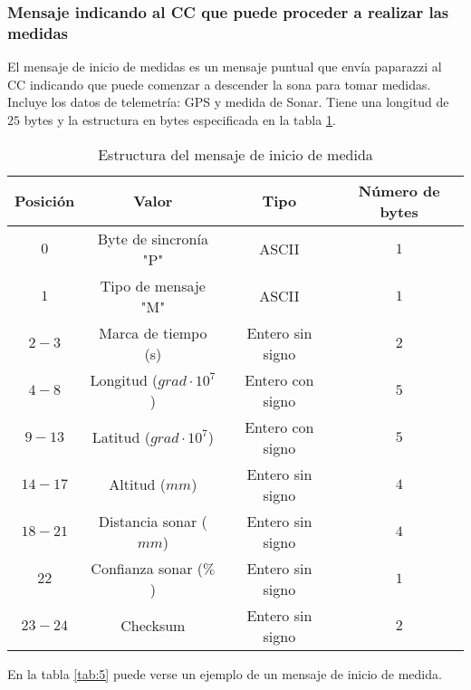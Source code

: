 \subsubsection{Mensaje indicando al CC que puede proceder a realizar las medidas}

El mensaje de inicio de medidas es un mensaje puntual que envía paparazzi al CC indicando que puede comenzar a descender la sona para tomar medidas. Incluye los datos de telemetría: GPS y medida de Sonar. Tiene una longitud de $25$ bytes y la estructura en bytes especificada en la tabla \ref{tab:4}.

\begin{table}[h]
	\centering
	\caption{Estructura del mensaje de inicio de medida}
	\begin{tabular}{|c|c|c|c|}\hline 
		\textbf{Posición}	& \textbf{Valor} & \textbf{Tipo} &\textbf{Número de bytes} \\ \hline \hline 
		$0$		& Byte de sincronía "P"				& ASCII	 			&	$1$ \\  \hline
		$1$		& Tipo de mensaje "M"				& ASCII	 			&	$1$ \\  \hline
		$2-3$	& Marca de tiempo (s)				& Entero sin signo	&   $2$ \\  \hline
		$4-8$	& Longitud ($grad \cdot 10^{7}$)	& Entero con signo	&   $5$ \\  \hline
		$9-13$	& Latitud ($grad \cdot 10^{7}$)		& Entero con signo	&  	$5$ \\  \hline
		$14-17$	& Altitud ($mm$)					& Entero sin signo	&   $4$ \\  \hline
		$18-21$	& Distancia sonar ($mm$)			& Entero sin signo	&   $4$ \\  \hline
		$22$	& Confianza sonar ($\%$)			& Entero sin signo	&   $1$ \\  \hline
		$23-24$	& Checksum 							& Entero sin signo	&   $2$ \\  \hline
	\end{tabular}
	\label{tab:4}
\end{table}

En la tabla \ref{tab:5} puede verse un ejemplo de un mensaje de inicio de medida.


